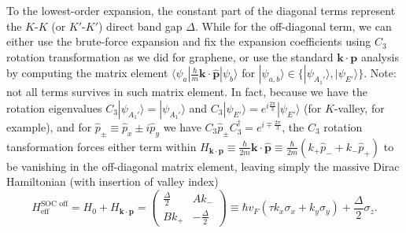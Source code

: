 To the lowest-order expansion, the constant part of the diagonal terms represent the $K$-$K$ (or $K'$-$K'$) direct band gap $\Delta$. While for the off-diagonal term, we can either use the brute-force expansion and fix the expansion coefficients using $C_3$ rotation transformation as we did for graphene, or use the standard $\bm k\cdot\bm p$ analysis \cite{dresselhaus1955spin,voon2009kp,kormanyos2015k} by computing the matrix element $\langle \psi_a|\frac{\hbar}{m}\bm k\cdot\hat{\bm p}|\psi_b\rangle$ for $|\psi_{a,b}\rangle\in\{|\psi_{A_1'}\rangle,|\psi_{E'}\rangle\}$. Note: not all terms survives in such matrix element. In fact, because we have the rotation eigenvalues $C_3|\psi_{A_1'}\rangle=|\psi_{A_1'}\rangle$ and $C_3|\psi_{E'}\rangle=e^{i\frac{2\pi}{3}}|\psi_{E'}\rangle$ (for $K$-valley, for example), and for $\hat p_\pm\equiv\hat p_x\pm i \hat p_y$ we have $C_3\hat p_\pm C_3^\dagger=e^{i\mp\frac{2\pi}{3}}$, the $C_3$ rotation tansformation forces either term within $H_{\bm k\cdot\bm p}\equiv\frac{\hbar}{2m}\bm k\cdot\hat{\bm p}\equiv\frac{\hbar}{2m}(k_+\hat p_- + k_-\hat p_+)$ to be vanishing in the off-diagonal matrix element, leaving simply the massive Dirac Hamiltonian (with insertion of valley index)
\begin{equation}
    H_{\text{eff}}^{\text{SOC off}}=H_0+H_{\bm k\cdot\bm p}=\begin{pmatrix}
        \frac{\Delta}{2} & Ak_-              \\
        Bk_+             & -\frac{\Delta}{2}
    \end{pmatrix}\equiv\hbar v_F(\tau k_x\sigma_x+k_y\sigma_y)+\frac{\Delta}{2}\sigma_z.
\end{equation}

